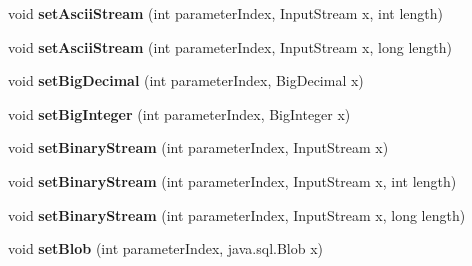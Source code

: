 \begin{DoxyCompactItemize}
\item 
\mbox{\label{interfacecom_1_1mysql_1_1cj_1_1_query_bindings_af740826505342555c0e7d37aab27196e}} 
void {\bfseries set\+Ascii\+Stream} (int parameter\+Index, Input\+Stream x, int length)
\item 
\mbox{\label{interfacecom_1_1mysql_1_1cj_1_1_query_bindings_ad5b2cb40d03009c8827d234cd7240e0e}} 
void {\bfseries set\+Ascii\+Stream} (int parameter\+Index, Input\+Stream x, long length)
\item 
\mbox{\label{interfacecom_1_1mysql_1_1cj_1_1_query_bindings_af8d9bc42bb6370ea5512c2500f912a79}} 
void {\bfseries set\+Big\+Decimal} (int parameter\+Index, Big\+Decimal x)
\item 
\mbox{\label{interfacecom_1_1mysql_1_1cj_1_1_query_bindings_ac1e13d61b7c0fa7c969c42b6c23fc74c}} 
void {\bfseries set\+Big\+Integer} (int parameter\+Index, Big\+Integer x)
\item 
\mbox{\label{interfacecom_1_1mysql_1_1cj_1_1_query_bindings_a9b69fba1d774379efe3e5a2aaa93483c}} 
void {\bfseries set\+Binary\+Stream} (int parameter\+Index, Input\+Stream x)
\item 
\mbox{\label{interfacecom_1_1mysql_1_1cj_1_1_query_bindings_afef3a0ee212290498998b21db259a81f}} 
void {\bfseries set\+Binary\+Stream} (int parameter\+Index, Input\+Stream x, int length)
\item 
\mbox{\label{interfacecom_1_1mysql_1_1cj_1_1_query_bindings_a65ca2a3794efcd8c908d80afb950f495}} 
void {\bfseries set\+Binary\+Stream} (int parameter\+Index, Input\+Stream x, long length)
\item 
\mbox{\label{interfacecom_1_1mysql_1_1cj_1_1_query_bindings_a55c147c4cd989f7533f34e82889f6f07}} 
void {\bfseries set\+Blob} (int parameter\+Index, java.\+sql.\+Blob x)
\item 

\end{DoxyCompactItemize}
